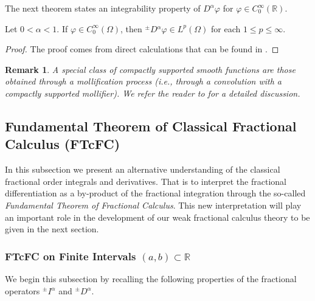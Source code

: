 \documentclass[leqno,final]{siamltex}
\numberwithin{equation}{section}
\newtheorem{remark}{Remark}[section]
\renewcommand{\(}{\bigl(}
\renewcommand{\)}{\bigr)}
\newcommand{\R}{\mathbb{R}}
\begin{document}
        The next theorem states an integrability property of $D^\alpha \varphi$ for $\varphi \in C^{\infty}_{0} (\R)$. 
        
        \begin{theorem}
           Let $0<\alpha< 1$.  If $\varphi \in C^{\infty}_{0}(\Omega)$, then ${^{\pm}}{D}{^{\alpha}} \varphi \in L^{p}(\Omega)$ for each $1 \leq p \leq \infty$.
        \end{theorem}

        \begin{proof} 
        The proof comes from direct calculations that can be found in \cite{Feng_Sutton}.
        \end{proof}
    
    
    \begin{remark}
    	A special class of compactly supported smooth functions are those obtained through 
    	a mollification process (i.e., through a convolution with a 
    	 compactly supported mollifier). We refer the reader to 
    	 \cite{Feng_Sutton} for a detailed discussion. 
    \end{remark}
    
       
 
\subsection{Fundamental Theorem of Classical Fractional Calculus (FTcFC)}\label{sec-3.1}
    In this subsection we present an alternative understanding of 
	the classical fractional order integrals and derivatives. That is to interpret 
	the fractional differentiation as a by-product of the fractional integration 
	through the so-called {\em  Fundamental Theorem of Fractional Calculus}. 
	This new interpretation will play an important role in the development of 
	our weak fractional calculus theory to be given in the next section.
 
\subsubsection{\bf FTcFC on Finite Intervals $(a,b)\subset \R$}\label{sec-3.1.1}
We begin this subsection by recalling the following properties of the fractional operators 
${^{\pm}}{I}{^{\alpha} }$ and $  {^{\pm}}{D}{^{\alpha} }$.
        
\end{document}
